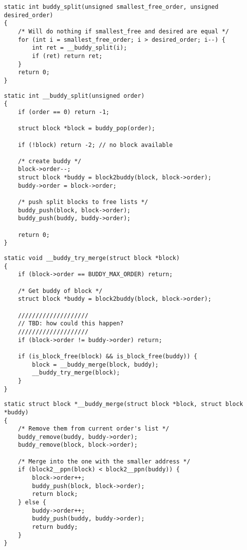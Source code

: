 \newpar{}
\begin{lstlisting}[style=bright_C++]
static int buddy_split(unsigned smallest_free_order, unsigned desired_order)
{
	/* Will do nothing if smallest_free and desired are equal */
	for (int i = smallest_free_order; i > desired_order; i--) {
		int ret = __buddy_split(i);
		if (ret) return ret;
	}
	return 0;
}
\end{lstlisting}

\newpar{}
\begin{lstlisting}[style=bright_C++]
static int __buddy_split(unsigned order)
{
    if (order == 0) return -1;

    struct block *block = buddy_pop(order);

    if (!block) return -2; // no block available

    /* create buddy */
    block->order--;
    struct block *buddy = block2buddy(block, block->order);
    buddy->order = block->order;

    /* push split blocks to free lists */
    buddy_push(block, block->order);
    buddy_push(buddy, buddy->order);

    return 0;
}
\end{lstlisting}

\newpar{}
\begin{lstlisting}[style=bright_C++]
static void __buddy_try_merge(struct block *block)
{
    if (block->order == BUDDY_MAX_ORDER) return;

    /* Get buddy of block */
    struct block *buddy = block2buddy(block, block->order);

    ////////////////////
    // TBD: how could this happen?
    ////////////////////
    if (block->order != buddy->order) return;

    if (is_block_free(block) && is_block_free(buddy)) {
        block = __buddy_merge(block, buddy);
        __buddy_try_merge(block);
    }
}
\end{lstlisting}
\newpar{}
\begin{lstlisting}[style=bright_C++]
static struct block *__buddy_merge(struct block *block, struct block *buddy)
{
    /* Remove them from current order's list */
    buddy_remove(buddy, buddy->order);
    buddy_remove(block, block->order);

    /* Merge into the one with the smaller address */
    if (block2__ppn(block) < block2__ppn(buddy)) {
        block->order++;
        buddy_push(block, block->order);
        return block;
    } else {
        buddy->order++;
        buddy_push(buddy, buddy->order);
        return buddy;
    }
}
\end{lstlisting}


